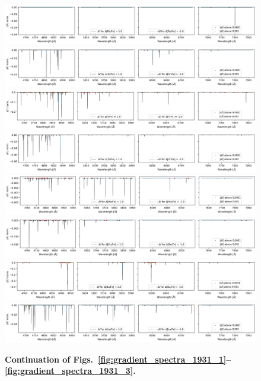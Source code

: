 \documentclass[
  journal=pasa,
  manuscript=research-paper, %
  year=2021,
  volume=37,
]{cup-journal}
\begin{document}
\begin{figure}[hbt!]
 \centering  
 \includegraphics[width=\textwidth]{figures/gradient_spectrum_1931_rb_fe.png}
 \includegraphics[width=\textwidth]{figures/gradient_spectrum_1931_sr_fe.png}
 \includegraphics[width=\textwidth]{figures/gradient_spectrum_1931_y_fe.png}
 \includegraphics[width=\textwidth]{figures/gradient_spectrum_1931_zr_fe.png}
 \includegraphics[width=\textwidth]{figures/gradient_spectrum_1931_mo_fe.png}
 \includegraphics[width=\textwidth]{figures/gradient_spectrum_1931_ru_fe.png}
 \includegraphics[width=\textwidth]{figures/gradient_spectrum_1931_ba_fe.png}
 \includegraphics[width=\textwidth]{figures/gradient_spectrum_1931_la_fe.png}
 \caption{\textbf{Continuation of Figs.~\ref{fig:gradient_spectra_1931_1}--\ref{fig:gradient_spectra_1931_3}.}} \label{fig:gradient_spectra_1931_4}
\end{figure}
\end{document}
